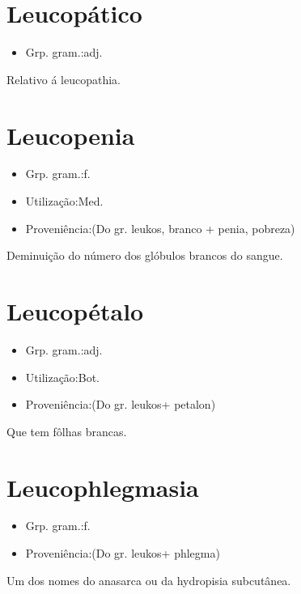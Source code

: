 \section{Leucopático}
\begin{itemize}
\item {Grp. gram.:adj.}
\end{itemize}
Relativo á leucopathia.
\section{Leucopenia}
\begin{itemize}
\item {Grp. gram.:f.}
\end{itemize}
\begin{itemize}
\item {Utilização:Med.}
\end{itemize}
\begin{itemize}
\item {Proveniência:(Do gr. \textunderscore leukos\textunderscore , branco + \textunderscore penia\textunderscore , pobreza)}
\end{itemize}
Deminuição do número dos glóbulos brancos do sangue.
\section{Leucopétalo}
\begin{itemize}
\item {Grp. gram.:adj.}
\end{itemize}
\begin{itemize}
\item {Utilização:Bot.}
\end{itemize}
\begin{itemize}
\item {Proveniência:(Do gr. \textunderscore leukos\textunderscore  + \textunderscore petalon\textunderscore )}
\end{itemize}
Que tem fôlhas brancas.
\section{Leucophlegmasia}
\begin{itemize}
\item {Grp. gram.:f.}
\end{itemize}
\begin{itemize}
\item {Proveniência:(Do gr. \textunderscore leukos\textunderscore  + \textunderscore phlegma\textunderscore )}
\end{itemize}
Um dos nomes do anasarca ou da hydropisia subcutânea.
